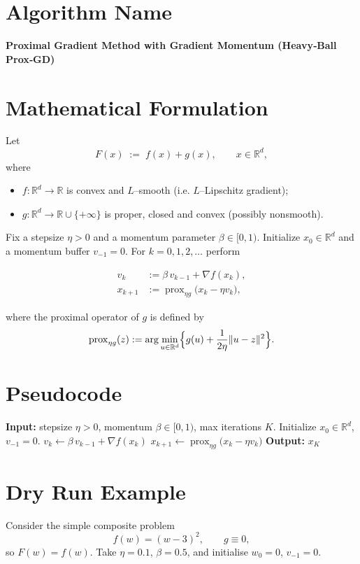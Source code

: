 \documentclass{article}
\newcommand{\prox}{\operatorname{prox}}
\newcommand{\R}{\mathbb{R}}
\begin{document}
\section*{Algorithm Name}
\textbf{Proximal Gradient Method with Gradient Momentum (Heavy‑Ball Prox‑GD)}

\section*{Mathematical Formulation}
Let 
\[
F(x)\;:=\;f(x)+g(x),\qquad x\in\R^{d},
\]
where  

\begin{itemize}[nosep]
\item $f:\R^{d}\rightarrow\R$ is convex and $L$–smooth (i.e. $L$–Lipschitz gradient);
\item $g:\R^{d}\rightarrow\R\cup\{+\infty\}$ is proper, closed and convex (possibly nonsmooth).
\end{itemize}
Fix a stepsize $\eta>0$ and a momentum parameter $\beta\in[0,1)$.  
Initialize $x_{0}\in\R^{d}$ and a momentum buffer $v_{-1}=0$.  
For $k=0,1,2,\dots$ perform

\[
\boxed{
\begin{aligned}
v_{k} &:= \beta\,v_{k-1}+ \nabla f(x_{k}),\\[4pt]
x_{k+1} &:= \prox_{\eta g}\!\bigl(x_{k}-\eta v_{k}\bigr),
\end{aligned}}
\tag{1}
\]

where the proximal operator of $g$ is defined by
\[
\prox_{\eta g}(z):=\arg\min_{u\in\R^{d}}\Bigl\{ g(u)+\frac{1}{2\eta}\|u-z\|^{2}\Bigr\}.
\]

\section*{Pseudocode}
\begin{algorithm}[H]
\caption{Heavy‑Ball Prox‑GD}
\begin{algorithmic}[1]
\STATE \textbf{Input:} stepsize $\eta>0$, momentum $\beta\in[0,1)$, max iterations $K$.
\STATE Initialize $x_{0}\in\R^{d}$, $v_{-1}=0$.
    \STATE $v_{k}\gets \beta\,v_{k-1}+ \nabla f(x_{k})$ \hfill{}
    \STATE $x_{k+1}\gets \prox_{\eta g}\!\bigl(x_{k}-\eta v_{k}\bigr)$
\ENDFOR
\STATE \textbf{Output:} $x_{K}$
\end{algorithmic}
\end{algorithm}

\section*{Dry Run Example}
Consider the simple composite problem
\[
f(w)=(w-3)^{2},\qquad g\equiv 0,
\]
so $F(w)=f(w)$.  
Take $\eta=0.1$, $\beta=0.5$, and initialise $w_{0}=0$, $v_{-1}=0$.
\end{document}
